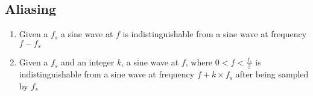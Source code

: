   \subsection{Aliasing}

    \begin{enumerate}
      \item Given a $ f_{s} $ a sine wave at $ f $ is indistinguishable
      from a sine wave at frequency $ f - f_{s} $
      \item Given a $ f_{s} $ and an integer $ k $, a sine wave at
      $ f $, where $ 0 < f < \frac{f_{s}}{2} $ is indistinguishable
      from a sine wave at frequency $ f + k \times f_{s} $ after being sampled
      by $ f_{s} $
    \end{enumerate}
